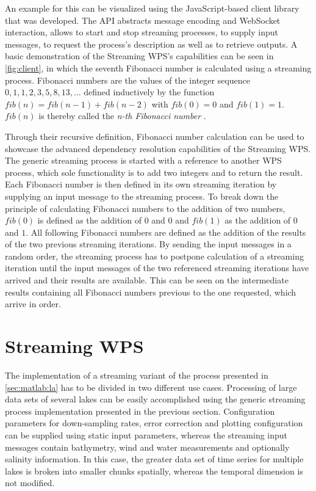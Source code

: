   

  An example for this can be visualized using the JavaScript-based client library that was developed. The \acs{API} abstracts message encoding and WebSocket interaction, allows to start and stop streaming processes, to supply input messages, to request the process's description as well as to retrieve outputs. A basic demonstration of the Streaming WPS's capabilities can be seen in \cref{fig:client}, in which the seventh Fibonacci number is calculated using a streaming process. Fibonacci numbers are the values of the integer sequence $0, 1, 1, 2, 3, 5, 8, 13, \dots$ defined inductively by the function $fib(n) = fib(n-1) + fib(n-2)$ with $fib(0) = 0$ and $fib(1) = 1$. $fib(n)$ is thereby called the \emph{n-th Fibonacci number} \citep{fibonacci}.

  Through their recursive definition, Fibonacci number calculation can be used to showcase the advanced dependency resolution capabilities of the Streaming WPS. The generic streaming process is started with a reference to another WPS process, which sole functionality is to add two integers and to return the result. Each Fibonacci number is then defined in its own streaming iteration by supplying an input message to the streaming process. To break down the principle of calculating Fibonacci numbers to the addition of two numbers, $fib(0)$ is defined as the addition of $0$ and $0$ and $fib(1)$ as the addition of $0$ and $1$. All following Fibonacci numbers are defined as the addition of the results of the two previous streaming iterations. By sending the input messages in a random order, the streaming process has to postpone calculation of a streaming iteration until the input messages of the two referenced streaming iterations have arrived and their results are available. This can be seen on the intermediate results containing all Fibonacci numbers previous to the one requested, which arrive in order.

\section{Streaming \la WPS}
  The implementation of a streaming variant of the \la process presented in \cref{sec:matlab:la} has to be divided in two different use cases. Processing of large data sets of several lakes can be easily accomplished using the generic streaming process implementation presented in the previous section. Configuration parameters for down-sampling rates, error correction and plotting configuration can be supplied using static input parameters, whereas the streaming input messages contain bathymetry, wind and water measurements and optionally salinity information. In this case, the greater data set of time series for multiple lakes is broken into smaller chunks spatially, whereas the temporal dimension is not modified.

